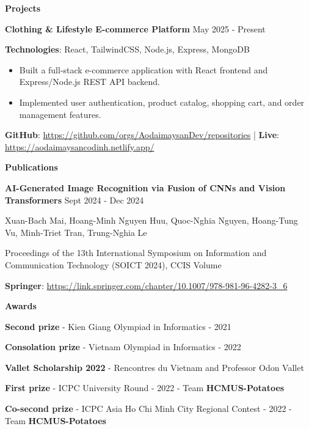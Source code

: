\documentclass[10pt]{article}
\begin{document}
\begin{center}
    \textbf{Projects}
\end{center}

\textbf{Clothing \& Lifestyle E-commerce Platform} \hfill May 2025 - Present

\textbf{Technologies}: React, TailwindCSS, Node.js, Express, MongoDB
\begin{itemize}[nosep, leftmargin=*]
    \item Built a full-stack e-commerce application with React frontend and Express/Node.js REST API backend.
    \item Implemented user authentication, product catalog, shopping cart, and order management features.
\end{itemize}
\textbf{GitHub}: \url{https://github.com/orgs/AodaimaysanDev/repositories} | \textbf{Live}: \url{https://aodaimaysancodinh.netlify.app/}

\begin{center}
    \textbf{Publications}
\end{center}
\textbf{AI-Generated Image Recognition via Fusion of CNNs and Vision Transformers} \hfill Sept 2024 - Dec 2024

Xuan-Bach Mai, Hoang-Minh Nguyen Huu, Quoc-Nghia Nguyen, Hoang-Tung Vu, Minh-Triet Tran, Trung-Nghia Le

Proceedings of the 13th International Symposium on Information and Communication Technology (SOICT 2024), CCIS Volume

\textbf{Springer}: \url{https://link.springer.com/chapter/10.1007/978-981-96-4282-3_6}

\begin{center}
    \textbf{Awards}
\end{center}
\textbf{Second prize} - Kien Giang Olympiad in Informatics - 2021

\textbf{Consolation prize} - Vietnam Olympiad in Informatics - 2022

\textbf{Vallet Scholarship 2022} - Rencontres du Vietnam and Professor Odon Vallet

\textbf{First prize} - ICPC University Round - 2022 - Team \textbf{HCMUS-Potatoes}

\textbf{Co-second prize} - ICPC Asia Ho Chi Minh City Regional Contest - 2022 - Team \textbf{HCMUS-Potatoes}
\end{document}
